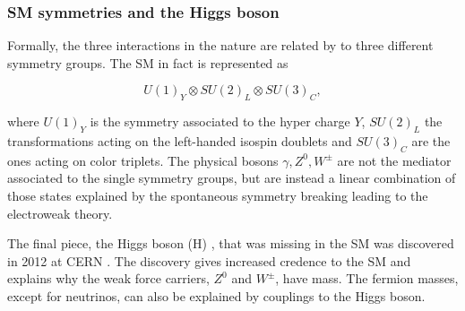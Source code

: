 \subsubsection{SM symmetries and the Higgs boson}
Formally, the three interactions in the nature are related by to three different symmetry groups. The SM in fact is represented as

\begin{equation}
    U(1)_Y \otimes SU(2)_L \otimes SU(3)_C,
\end{equation}

where $U(1)_Y$ is the symmetry associated to the hyper charge $Y$, $SU(2)_L$ the transformations acting on the left-handed isospin doublets and $SU(3)_C$ are the ones acting on color triplets. The physical bosons $\gamma, Z^0, W^\pm$ are not the mediator associated to the single symmetry groups, but are instead a linear combination of those states explained by the spontaneous symmetry breaking leading to the electroweak theory. 

The final piece, the Higgs boson (H) \cite{thomson}, that was missing in the SM was discovered in 2012 at CERN \cite{Higgs_ATLAS, Higgs_CMS}. The discovery gives increased credence to the SM and explains why the weak force carriers, $Z^0$ and $ W^\pm $, have mass. The fermion masses, except for neutrinos, can also be explained by couplings to the Higgs boson. 


